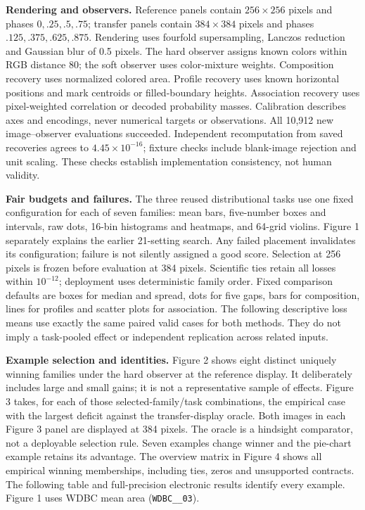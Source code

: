 \documentclass[10pt]{article}
\begin{document}
\textbf{Rendering and observers.} Reference panels contain $256\times256$ pixels and phases $0,.25,.5,.75$; transfer panels contain $384\times384$ pixels and phases $.125,.375,.625,.875$. Rendering uses fourfold supersampling, Lanczos reduction and Gaussian blur of 0.5 pixels. The hard observer assigns known colors within RGB distance 80; the soft observer uses color-mixture weights. Composition recovery uses normalized colored area. Profile recovery uses known horizontal positions and mark centroids or filled-boundary heights. Association recovery uses pixel-weighted correlation or decoded probability masses. Calibration describes axes and encodings, never numerical targets or observations. All 10,912 new image--observer evaluations succeeded. Independent recomputation from saved recoveries agrees to $4.45\times10^{-16}$; fixture checks include blank-image rejection and unit scaling. These checks establish implementation consistency, not human validity.

\textbf{Fair budgets and failures.} The three reused distributional tasks use one fixed configuration for each of seven families: mean bars, five-number boxes and intervals, raw dots, 16-bin histograms and heatmaps, and 64-grid violins. Figure 1 separately explains the earlier 21-setting search. Any failed placement invalidates its configuration; failure is not silently assigned a good score. Selection at 256 pixels is frozen before evaluation at 384 pixels. Scientific ties retain all losses within $10^{-12}$; deployment uses deterministic family order. Fixed comparison defaults are boxes for median and spread, dots for five gaps, bars for composition, lines for profiles and scatter plots for association. The following descriptive loss means use exactly the same paired valid cases for both methods. They do not imply a task-pooled effect or independent replication across related inputs.



\textbf{Example selection and identities.} Figure 2 shows eight distinct uniquely winning families under the hard observer at the reference display. It deliberately includes large and small gains; it is not a representative sample of effects. Figure 3 takes, for each of those selected-family/task combinations, the empirical case with the largest deficit against the transfer-display oracle. Both images in each Figure 3 panel are displayed at 384 pixels. The oracle is a hindsight comparator, not a deployable selection rule. Seven examples change winner and the pie-chart example retains its advantage. The overview matrix in Figure 4 shows all empirical winning memberships, including ties, zeros and unsupported contracts. The following table and full-precision electronic results identify every example. Figure 1 uses WDBC mean area (\texttt{WDBC\_\_03}).
\end{document}
